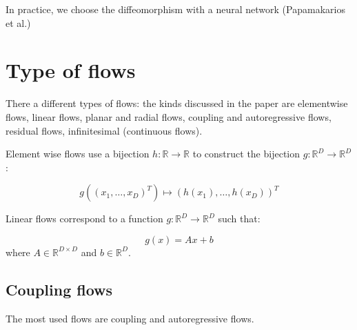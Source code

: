 \documentclass{article}
\theoremstyle{definition}
\theoremstyle{definition}
\theoremstyle{remark}
\begin{document}
In practice, we choose the diffeomorphism with a neural network (Papamakarios et al.)

\section{Type of flows}

There a different types of flows: the kinds discussed in the paper are elementwise flows, linear flows, planar and radial flows, coupling and autoregressive flows, residual flows, infinitesimal (continuous flows).

Element wise flows use a bijection $h: \mathbb{R} \rightarrow \mathbb{R}$ to construct the bijection $g: \mathbb{R}^D \rightarrow \mathbb{R}^D$:

$$ g((x_1, \dots, x_D)^T) \mapsto (h(x_1), \dots, h(x_D))^T $$

Linear flows correspond to a function $g: \mathbb{R}^D \rightarrow \mathbb{R}^D$ such that:

$$ g(x)=Ax+b$$
where $A \in \mathbb{R}^{D\times D}$ and $b \in \mathbb{R}^{D}$.

\subsection{Coupling flows}

The most used flows are coupling and autoregressive flows.
\end{document}
